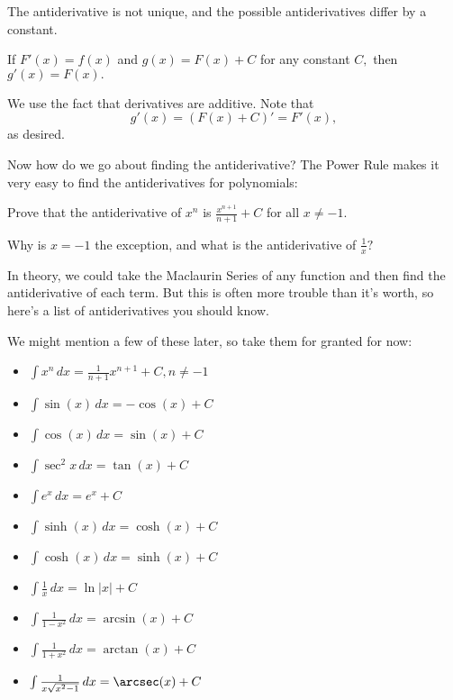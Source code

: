 \documentclass[mast]{lucky}
\begin{document}
The antiderivative is not unique, and the possible antiderivatives differ by a constant.

\begin{theo}
If $F'(x)=f(x)$ and $g(x)=F(x)+C$ for any constant $C,$ then $g'(x)=F(x).$
\end{theo}

\begin{pro}
We use the fact that derivatives are additive. Note that
\[g'(x)=(F(x)+C)'=F'(x),\]
as desired.
\end{pro}

Now how do we go about finding the antiderivative? The Power Rule makes it very easy to find the antiderivatives for polynomials:

\begin{exer}
Prove that the antiderivative of $x^n$ is $\frac{x^{n+1}}{n+1}+C$ for all $x\neq -1.$
\end{exer}

\begin{exer}
Why is $x=-1$ the exception, and what is the antiderivative of $\frac{1}{x}?$
\end{exer}

In theory, we could take the Maclaurin Series of any function and then find the antiderivative of each term. But this is often more trouble than it's worth, so here's a list of antiderivatives you should know.

\begin{theo} %
We might mention a few of these later, so take them for granted for now:
\begin{itemize}
    \item $\int x^n\,dx=\frac{1}{n+1}x^{n+1}+C,n\neq -1$
    \item $\int \sin(x)\, dx=-\cos(x)+C$
    \item $\int \cos(x)\,dx=\sin(x)+C$
    \item $\int\sec^2x\,dx=\tan(x)+C$
    \item $\int e^x\,dx=e^x+C$
    \item $\int\sinh(x)\,dx=\cosh(x)+C$
    \item $\int\cosh(x)\,dx=\sinh(x)+C$
    \item $\int\frac{1}{x}\,dx=\ln|x|+C$
    \item $\int\frac{1}{1-x^2}\,dx=\arcsin(x)+C$
    \item $\int\frac{1}{1+x^2}\,dx=\arctan(x)+C$
    \item $\int\frac{1}{x\sqrt{x^2-1}}\,dx=\arcsec(x)+C$
\end{itemize}
\end{theo}
\end{document}
